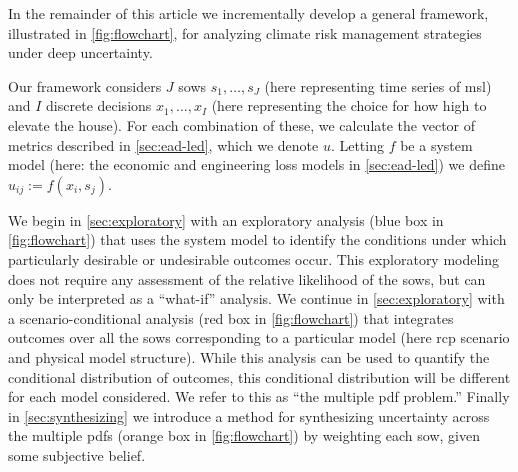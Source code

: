 \documentclass[11pt]{article}
\begin{document}
In the remainder of this article we incrementally develop a general framework, illustrated in \cref{fig:flowchart}, for analyzing climate risk management strategies under deep uncertainty.

Our framework considers $J$ \glspl{sow} $s_1, \ldots, s_J$ (here representing time series of \gls{msl}) and $I$ discrete decisions $x_1, \ldots, x_I$ (here representing the choice for how high to elevate the house).
For each combination of these, we calculate the vector of metrics described in \cref{sec:ead-led}, which we denote $u$.
Letting $f$ be a system model (here: the economic and engineering loss models in \cref{sec:ead-led}) we define $u_{ij} := f(x_i, s_j)$.

We begin in \cref{sec:exploratory} with an exploratory analysis (blue box in \cref{fig:flowchart}) that uses the system model to identify the conditions under which particularly desirable or undesirable outcomes occur.
This exploratory modeling does not require any assessment of the relative likelihood of the \glspl{sow}, but can only be interpreted as a ``what-if'' analysis.
We continue in \cref{sec:exploratory} with a scenario-conditional analysis (red box in \cref{fig:flowchart}) that integrates outcomes over all the \glspl{sow} corresponding to a particular model (here \gls{rcp} scenario and physical model structure).
While this analysis can be used to quantify the conditional distribution of outcomes, this conditional distribution will be different for each model considered.
We refer to this as ``the multiple \gls{pdf} problem.''
Finally in \cref{sec:synthesizing} we introduce a method for synthesizing uncertainty across the multiple \glspl{pdf} (orange box in \cref{fig:flowchart}) by weighting each \gls{sow}, given some subjective belief.
\end{document}
